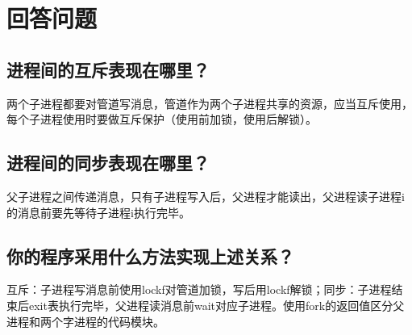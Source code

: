 \documentclass[11pt]{article}
\begin{document}
\section{回答问题}
\subsection{进程间的互斥表现在哪里？}
两个子进程都要对管道写消息，管道作为两个子进程共享的资源，应当互斥使用，每个子进程使用时要做互斥保护（使用前加锁，使用后解锁）。

\subsection{进程间的同步表现在哪里？}
父子进程之间传递消息，只有子进程写入后，父进程才能读出，父进程读子进程i的消息前要先等待子进程i执行完毕。

\subsection{你的程序采用什么方法实现上述关系？}
互斥：子进程写消息前使用lockf对管道加锁，写后用lockf解锁；同步：子进程结束后exit表执行完毕，父进程读消息前wait对应子进程。使用fork的返回值区分父进程和两个字进程的代码模块。
\end{document}
